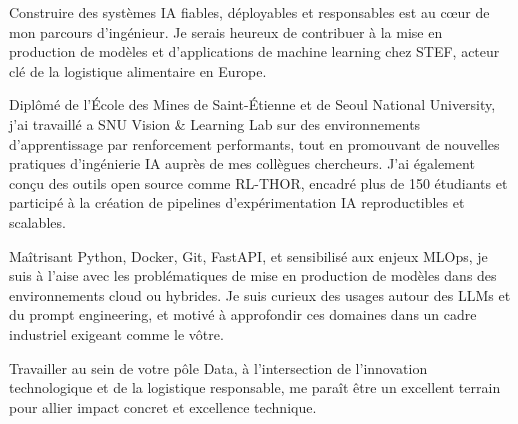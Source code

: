 
\newcommand{\Company}{STEF}
\recipient{\RecruitmentTeam{\Company}}{\Company\\Theix\\France}
\makelettertitle
Construire des systèmes IA fiables, déployables et responsables est au cœur de mon parcours d'ingénieur. Je serais heureux de contribuer à la mise en production de modèles et d'applications de machine learning chez STEF, acteur clé de la logistique alimentaire en Europe.

Diplômé de l'École des Mines de Saint-Étienne et de Seoul National University, j'ai travaillé a SNU Vision \& Learning Lab sur des environnements d'apprentissage par renforcement performants, tout en promouvant de nouvelles pratiques d'ingénierie IA auprès de mes collègues chercheurs. J'ai également conçu des outils open source comme RL-THOR, encadré plus de 150 étudiants et participé à la création de pipelines d'expérimentation IA reproductibles et scalables.

Maîtrisant Python, Docker, Git, FastAPI, et sensibilisé aux enjeux MLOps, je suis à l'aise avec les problématiques de mise en production de modèles dans des environnements cloud ou hybrides. Je suis curieux des usages autour des LLMs et du prompt engineering, et motivé à approfondir ces domaines dans un cadre industriel exigeant comme le vôtre.

Travailler au sein de votre pôle Data, à l'intersection de l'innovation technologique et de la logistique responsable, me paraît être un excellent terrain pour allier impact concret et excellence technique.

\makeletterclosing
